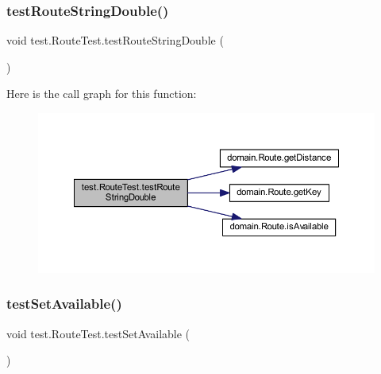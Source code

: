 \subsubsection{\texorpdfstring{test\+Route\+String\+Double()}{testRouteStringDouble()}}
{\footnotesize\ttfamily void test.\+Route\+Test.\+test\+Route\+String\+Double (\begin{DoxyParamCaption}{ }\end{DoxyParamCaption})}

Here is the call graph for this function\+:\nopagebreak
\begin{figure}[H]
\begin{center}
\leavevmode
\includegraphics[width=350pt]{classtest_1_1_route_test_a52c3fdb8ab37480b0fecd7e9b6fa0f06_cgraph}
\end{center}
\end{figure}
\mbox{\label{classtest_1_1_route_test_a800664a2fbe5f7c806114a4a9e576529}} 
\subsubsection{\texorpdfstring{test\+Set\+Available()}{testSetAvailable()}}
{\footnotesize\ttfamily void test.\+Route\+Test.\+test\+Set\+Available (\begin{DoxyParamCaption}{ }\end{DoxyParamCaption})}

